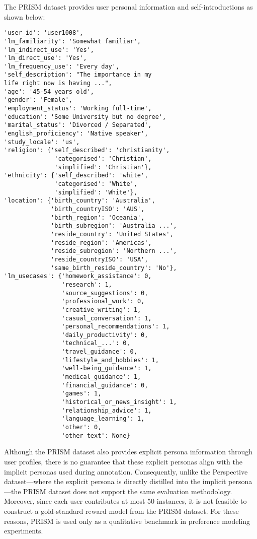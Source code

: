 The PRISM dataset provides user personal information and self-introductions as shown below:

\begin{Verbatim}[fontsize=\small]
'user_id': 'user1008',
'lm_familiarity': 'Somewhat familiar',
'lm_indirect_use': 'Yes',
'lm_direct_use': 'Yes',
'lm_frequency_use': 'Every day',
'self_description': "The importance in my
life right now is having ...",
'age': '45-54 years old',
'gender': 'Female',
'employment_status': 'Working full-time',
'education': 'Some University but no degree',
'marital_status': 'Divorced / Separated',
'english_proficiency': 'Native speaker',
'study_locale': 'us',
'religion': {'self_described': 'christianity',
              'categorised': 'Christian',
              'simplified': 'Christian'},
'ethnicity': {'self_described': 'white',
              'categorised': 'White',
              'simplified': 'White'},
'location': {'birth_country': 'Australia',
             'birth_countryISO': 'AUS',
             'birth_region': 'Oceania',
             'birth_subregion': 'Australia ...',
             'reside_country': 'United States',
             'reside_region': 'Americas',
             'reside_subregion': 'Northern ...',
             'reside_countryISO': 'USA',
             'same_birth_reside_country': 'No'},
'lm_usecases': {'homework_assistance': 0,
                'research': 1,
                'source_suggestions': 0,
                'professional_work': 0,
                'creative_writing': 1,
                'casual_conversation': 1,
                'personal_recommendations': 1,
                'daily_productivity': 0,
                'technical_...': 0,
                'travel_guidance': 0,
                'lifestyle_and_hobbies': 1,
                'well-being_guidance': 1,
                'medical_guidance': 1,
                'financial_guidance': 0,
                'games': 1,
                'historical_or_news_insight': 1,
                'relationship_advice': 1,
                'language_learning': 1,
                'other': 0,
                'other_text': None}
\end{Verbatim}

Although the PRISM dataset also provides explicit persona information through user profiles, there is no guarantee that these explicit personas align with the implicit personas used during annotation. Consequently, unlike the Perspective dataset—where the explicit persona is directly distilled into the implicit persona—the PRISM dataset does not support the same evaluation methodology. Moreover, since each user contributes at most 50 instances, it is not feasible to construct a gold-standard reward model from the PRISM dataset. For these reasons, PRISM is used only as a qualitative benchmark in preference modeling experiments.

